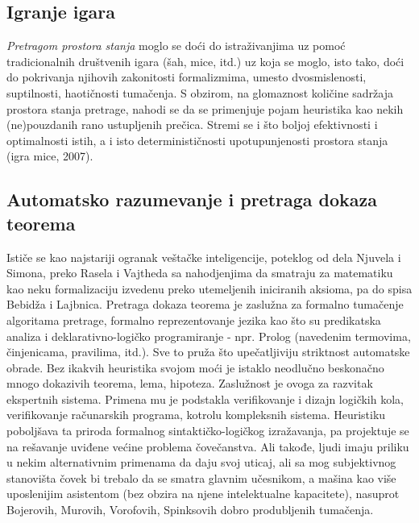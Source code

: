 \documentclass[fontsize=11bp, paper=a4]{scrartcl}
\begin{document}
\subsection{\normalsize{Igranje igara}}
\textit{Pretragom prostora stanja} moglo se doći do istraživanjima uz pomoć tradicionalnih društvenih igara (šah, mice, itd.) uz koja se moglo, isto tako, doći do pokrivanja njihovih zakonitosti formalizmima, umesto dvosmislenosti, suptilnosti, haotičnosti tumačenja. S obzirom, na glomaznost količine sadržaja prostora stanja pretrage, nahodi se da se primenjuje pojam heuristika kao nekih (ne)pouzdanih rano ustupljenih prečica. Stremi se i što boljoj efektivnosti i optimalnosti istih, a i isto determinističnosti upotupunjenosti prostora stanja (igra mice, 2007). 

\subsection{\normalsize{Automatsko razumevanje i pretraga dokaza teorema}}
Ističe se kao najstariji ogranak veštačke inteligencije, poteklog od dela Njuvela i Simona, preko Rasela i Vajtheda sa nahodjenjima da smatraju za matematiku kao neku formalizaciju izvedenu preko utemeljenih iniciranih aksioma, pa do spisa Bebidža i Lajbnica. Pretraga dokaza teorema je zaslužna za formalno tumačenje algoritama pretrage, formalno reprezentovanje jezika kao što su predikatska analiza i deklarativno-logičko programiranje - npr. Prolog (navedenim termovima, činjenicama, pravilima, itd.). Sve to pruža što upečatljiviju striktnost automatske obrade. Bez ikakvih heuristika svojom moći je istaklo neodlučno beskonačno mnogo dokazivih teorema, lema, hipoteza. Zaslužnost je ovoga za razvitak ekspertnih sistema. Primena mu je podstakla verifikovanje i dizajn logičkih kola, verifikovanje računarskih programa, kotrolu kompleksnih sistema. Heuristiku poboljšava ta priroda formalnog sintaktičko-logičkog izražavanja, pa projektuje se na rešavanje uviđene većine problema čovečanstva. Ali takođe, ljudi imaju priliku u nekim alternativnim primenama da daju svoj uticaj, ali sa mog subjektivnog stanovišta čovek bi trebalo da se smatra glavnim učesnikom, a mašina kao više uposlenijim asistentom (bez obzira na njene intelektualne kapacitete)\cite{zavisnost}, nasuprot Bojerovih, Murovih, Vorofovih, Spinksovih dobro produbljenih tumačenja.
\end{document}
